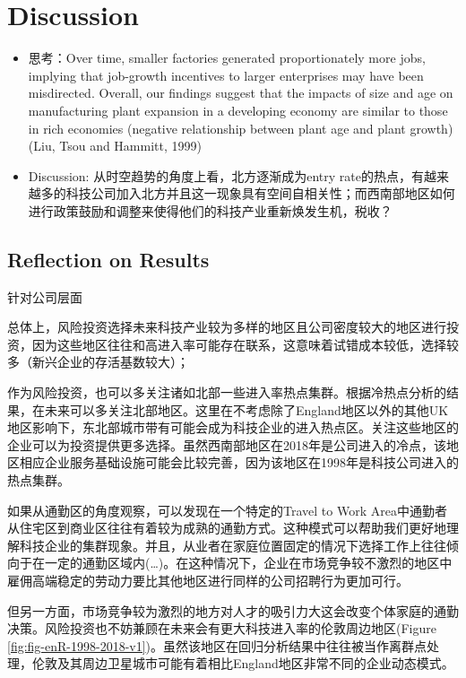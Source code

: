 \documentclass[
  12pt,
  oneside]{book}
\begin{document}
\hypertarget{discussion}{%
\chapter{Discussion}\label{discussion}}

\begin{itemize}
\item
  思考：Over time, smaller factories generated proportionately more jobs, implying that job-growth incentives to larger enterprises may have been misdirected. Overall, our findings suggest that the impacts of size and age on manufacturing plant expansion in a developing economy are similar to those in rich economies (negative relationship between plant age and plant growth)(Liu, Tsou and Hammitt, 1999)
\item
  Discussion: 从时空趋势的角度上看，北方逐渐成为entry rate的热点，有越来越多的科技公司加入北方并且这一现象具有空间自相关性；而西南部地区如何进行政策鼓励和调整来使得他们的科技产业重新焕发生机，税收？
\end{itemize}

\hypertarget{reflection-on-results}{%
\section{Reflection on Results}\label{reflection-on-results}}

针对公司层面

总体上，风险投资选择未来科技产业较为多样的地区且公司密度较大的地区进行投资，因为这些地区往往和高进入率可能存在联系，这意味着试错成本较低，选择较多（新兴企业的存活基数较大）；

作为风险投资，也可以多关注诸如北部一些进入率热点集群。根据冷热点分析的结果，在未来可以多关注北部地区。这里在不考虑除了England地区以外的其他UK地区影响下，东北部城市带有可能会成为科技企业的进入热点区。关注这些地区的企业可以为投资提供更多选择。虽然西南部地区在2018年是公司进入的冷点，该地区相应企业服务基础设施可能会比较完善，因为该地区在1998年是科技公司进入的热点集群。

如果从通勤区的角度观察，可以发现在一个特定的Travel to Work Area中通勤者从住宅区到商业区往往有着较为成熟的通勤方式。这种模式可以帮助我们更好地理解科技企业的集群现象。并且，从业者在家庭位置固定的情况下选择工作上往往倾向于在一定的通勤区域内(\ldots)。在这种情况下，企业在市场竞争较不激烈的地区中雇佣高端稳定的劳动力要比其他地区进行同样的公司招聘行为更加可行。

但另一方面，市场竞争较为激烈的地方对人才的吸引力大这会改变个体家庭的通勤决策。风险投资也不妨兼顾在未来会有更大科技进入率的伦敦周边地区(Figure \ref{fig:fig-enR-1998-2018-v1})。虽然该地区在回归分析结果中往往被当作离群点处理，伦敦及其周边卫星城市可能有着相比England地区非常不同的企业动态模式。
\end{document}
